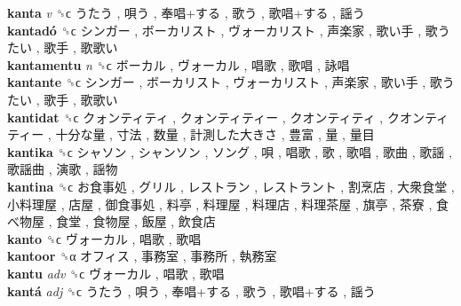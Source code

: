 \textbf{kanta} \emph{v}  ␝ϲ   うたう ,  唄う ,  奉唱+する ,  歌う ,  歌唱+する ,  謡う   \\
\textbf{kantadó} ␝ϲ   シンガー ,  ボーカリスト ,  ヴォーカリスト ,  声楽家 ,  歌い手 ,  歌うたい ,  歌手 ,  歌歌い   \\
\textbf{kantamentu} \emph{n}  ␝ϲ   ボーカル ,  ヴォーカル ,  唱歌 ,  歌唱 ,  詠唱   \\
\textbf{kantante} ␝ϲ   シンガー ,  ボーカリスト ,  ヴォーカリスト ,  声楽家 ,  歌い手 ,  歌うたい ,  歌手 ,  歌歌い   \\
\textbf{kantidat} ␝ϲ   クォンティティ ,  クォンティティー ,  クオンティティ ,  クオンティティー ,  十分な量 ,  寸法 ,  数量 ,  計測した大きさ ,  豊富 ,  量 ,  量目   \\
\textbf{kantika} ␝ϲ   シャソン ,  シャンソン ,  ソング ,  唄 ,  唱歌 ,  歌 ,  歌唱 ,  歌曲 ,  歌謡 ,  歌謡曲 ,  演歌 ,  謡物   \\
\textbf{kantina} ␝ϲ   お食事処 ,  グリル ,  レストラン ,  レストラント ,  割烹店 ,  大衆食堂 ,  小料理屋 ,  店屋 ,  御食事処 ,  料亭 ,  料理屋 ,  料理店 ,  料理茶屋 ,  旗亭 ,  茶寮 ,  食べ物屋 ,  食堂 ,  食物屋 ,  飯屋 ,  飲食店   \\
\textbf{kanto} ␝ϲ   ヴォーカル ,  唱歌 ,  歌唱   \\
\textbf{kantoor} ␝α   オフィス ,  事務室 ,  事務所 ,  執務室   \\
\textbf{kantu} \emph{adv}  ␝ϲ   ヴォーカル ,  唱歌 ,  歌唱   \\
\textbf{kantá} \emph{adj}  ␝ϲ   うたう ,  唄う ,  奉唱+する ,  歌う ,  歌唱+する ,  謡う   \\
